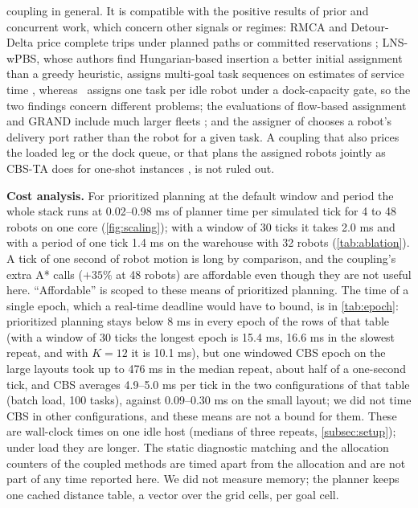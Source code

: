 coupling in general. It is compatible with the positive results of prior
and concurrent work, which concern other signals or regimes: RMCA and
Detour-Delta price complete trips under planned paths or committed
reservations \citep{chen2021integrated,hirayama2026detour}; LNS-wPBS, whose
authors find Hungarian-based insertion a better initial assignment than a
greedy heuristic, assigns multi-goal task
sequences on estimates of service time \citep{xu2022multigoal}, whereas
\sname\ assigns one task per idle robot under a dock-capacity gate, so the
two findings concern different problems; the
evaluations of flow-based assignment and GRAND include much larger fleets
\citep{zhang2026flow,gaber2026grand}; and the assigner of
\citet{zhu2026combined} chooses a robot's delivery port rather than the
robot for a given task. A coupling that also prices the loaded leg or the
dock queue, or that plans the assigned robots jointly as CBS-TA does for
one-shot instances \citep{honig2018cbsta}, is not ruled out.

\noindent\textbf{Cost analysis.}
For prioritized planning at the default window and period the whole stack runs at 0.02--0.98 ms of planner time per simulated tick for 4
to 48 robots on one core (\cref{fig:scaling}); with a window of 30 ticks it takes 2.0 ms and with a period of one tick
1.4 ms on the warehouse with 32 robots (\cref{tab:ablation}). A tick of one second of robot
motion is long by comparison, and the
coupling's extra A* calls ($+35\%$ at 48 robots) are affordable even though
they are not useful here. ``Affordable'' is scoped to these means of
prioritized planning. The time of a single epoch, which a real-time deadline would
have to bound, is in \cref{tab:epoch}: prioritized planning stays below 8 ms in
every epoch of the rows of that table (with a window of 30 ticks the longest epoch is
15.4 ms, 16.6 ms in the slowest repeat, and with $K=12$ it is 10.1 ms),
but one windowed CBS epoch on the large layouts took up to
476 ms in the median repeat, about half of a one-second tick, and CBS averages
4.9--5.0 ms per tick in the two configurations of that table (batch load, 100 tasks), against 0.09--0.30 ms
on the small layout; we did not time CBS in other configurations, and these means are not a bound for them.
These are wall-clock times on one idle host
(medians of three repeats, \cref{subsec:setup}); under load they are longer. The
static diagnostic matching and the allocation counters of the coupled methods are
timed apart from the allocation and are not part of any time reported here. We did not measure memory;
the planner keeps one cached distance table, a vector over the grid cells,
per goal cell.

